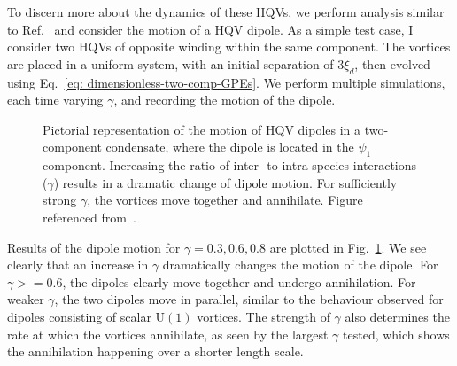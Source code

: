 To discern more about the dynamics of these HQVs, we perform analysis similar to
Ref.~\cite{Kasamatsu2016} and consider the motion of a HQV dipole.
As a simple test case, I consider two HQVs of opposite winding within the same
component.
The vortices are placed in a uniform system, with an initial separation of
\(3\xi_d\), then evolved using Eq.~\eqref{eq: dimensionless-two-comp-GPEs}.
We perform multiple simulations, each time varying \(\gamma\), and recording the
motion of the dipole.

\begin{figure}
    \centering
    \caption{\label{fig: HQV-dipole-motion}Pictorial representation of the
    motion of HQV dipoles in a two-component condensate, where the dipole is
    located in the \(\psi_1\) component.
    Increasing the ratio of inter- to intra-species interactions (\(\gamma\))
    results in a dramatic change of dipole motion.
    For sufficiently strong \(\gamma\), the vortices move together and
    annihilate.
    Figure referenced from~\cite{Kasamatsu2016}.}
\end{figure}
Results of the dipole motion for \(\gamma=0.3, 0.6, 0.8\) are plotted in
Fig.~\ref{fig: HQV-dipole-motion}.
We see clearly that an increase in \(\gamma\) dramatically changes the motion
of the dipole.
For \(\gamma>=0.6\), the dipoles clearly move together and undergo annihilation.
For weaker \(\gamma\), the two dipoles move in parallel, similar to
the behaviour observed for dipoles consisting of scalar \(\mathrm{U}(1)\)
vortices.
The strength of \(\gamma\) also determines the rate at which the vortices
annihilate, as seen by the largest \(\gamma\) tested, which shows the
annihilation happening over a shorter length scale.
